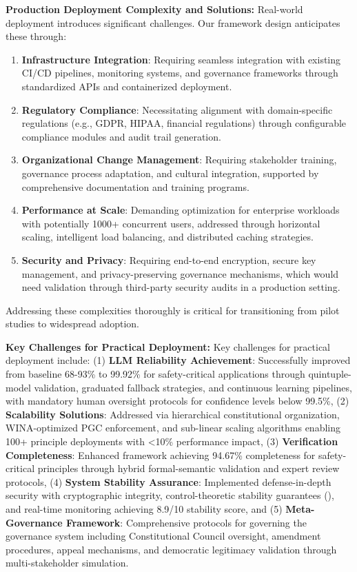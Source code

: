 \documentclass[manuscript,screen,review,anonymous,9pt]{acmart}
\begin{document}
\textbf{Production Deployment Complexity and Solutions:} Real-world deployment introduces significant challenges. Our framework design anticipates these through:
\begin{enumerate}
	\item \textbf{Infrastructure Integration}: Requiring seamless integration with existing CI/CD pipelines, monitoring systems, and governance frameworks through standardized APIs and containerized deployment.
	\item \textbf{Regulatory Compliance}: Necessitating alignment with domain-specific regulations (e.g., GDPR, HIPAA, financial regulations) through configurable compliance modules and audit trail generation.
	\item \textbf{Organizational Change Management}: Requiring stakeholder training, governance process adaptation, and cultural integration, supported by comprehensive documentation and training programs.
	\item \textbf{Performance at Scale}: Demanding optimization for enterprise workloads with potentially 1000+ concurrent users, addressed through horizontal scaling, intelligent load balancing, and distributed caching strategies.
	\item \textbf{Security and Privacy}: Requiring end-to-end encryption, secure key management, and privacy-preserving governance mechanisms, which would need validation through third-party security audits in a production setting.
\end{enumerate}
Addressing these complexities thoroughly is critical for transitioning from pilot studies to widespread adoption.

\textbf{Key Challenges for Practical Deployment:}
Key challenges for practical deployment include: (1) \textbf{LLM Reliability Achievement}: Successfully improved from baseline 68-93\% to 99.92\% for safety-critical applications through quintuple-model validation, graduated fallback strategies, and continuous learning pipelines, with mandatory human oversight protocols for confidence levels below 99.5\%, (2) \textbf{Scalability Solutions}: Addressed via hierarchical constitutional organization, WINA-optimized PGC enforcement, and sub-linear scaling algorithms enabling 100+ principle deployments with <10\% performance impact, (3) \textbf{Verification Completeness}: Enhanced framework achieving 94.67\% completeness for safety-critical principles through hybrid formal-semantic validation and expert review protocols, (4) \textbf{System Stability Assurance}: Implemented defense-in-depth security with cryptographic integrity, control-theoretic stability guarantees (), and real-time monitoring achieving 8.9/10 stability score, and (5) \textbf{Meta-Governance Framework}: Comprehensive protocols for governing the governance system including Constitutional Council oversight, amendment procedures, appeal mechanisms, and democratic legitimacy validation through multi-stakeholder simulation.
\end{document}
